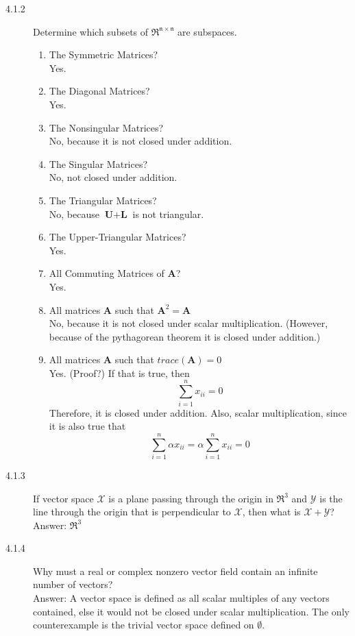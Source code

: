 \documentclass[times, 12pt]{article}
\begin{document}
\begin{description}
\item[4.1.2] Determine which subsets of $\mathfrak{R^{n\times n}}$ are
subspaces.
\begin{enumerate}
\renewcommand{\labelenumi}{(\alph{enumi})}
\item The Symmetric Matrices? \\ Yes.
\item The Diagonal Matrices? \\ Yes.
\item The Nonsingular Matrices? \\ No, because it is not closed
under addition.
\item The Singular Matrices? \\ No, not closed under
addition.
\item The Triangular Matrices? \\ No, because $\textbf{U} +
\textbf{L}$ is not triangular.
\item The Upper-Triangular Matrices? \\ Yes.
\item All Commuting Matrices of \textbf{A}? \\ Yes.
\item All matrices \textbf{A} such that $\textbf{A}^2 = \textbf{A}$
\\ No, because it is not closed under scalar multiplication.
(However, because of the pythagorean theorem it is closed under
addition.)
\item All matrices \textbf{A} such that $trace(\textbf{A}) = 0$ \\
Yes. (Proof?) If that is true, then
$$\displaystyle\sum_{i=1}^nx_{ii} = 0$$ Therefore, it is closed under
addition. Also, scalar multiplication, since it is also true that
$$\displaystyle\sum_{i=1}^n\alpha x_{ii} = \displaystyle\alpha\sum_{i=1}^nx_{ii}
= 0$$
\end{enumerate}
\end{description}

\begin{description}
\item[4.1.3] If vector space $\mathcal{X}$ is a plane passing through the origin in $\mathfrak{R}^3$ and $\mathcal{Y}$ is the line through the origin that is perpendicular
to $\mathcal{X}$, then what is $\mathcal{X + Y}$? \\[1cm]
Answer: $\mathfrak{R}^3$
\end{description}

\begin{description}
\item[4.1.4] Why must a real or complex nonzero vector field contain an infinite number of vectors? \\[1cm]
Answer: A vector space is defined as all scalar multiples of any
vectors contained, else it would not be closed under scalar
multiplication. The only counterexample is the trivial vector space
defined on $\emptyset$.
\end{description}
\end{document}
